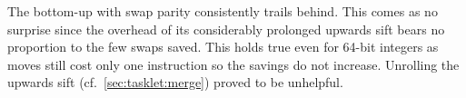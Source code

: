 The bottom-up \HS{} with swap parity consistently trails behind.
This comes as no surprise since the overhead of its considerably prolonged upwards sift bears no proportion to the few swaps saved.
This holds true even for 64-bit integers as moves still cost only one instruction so the savings do not increase.
Unrolling the upwards sift (cf.\ \cref{sec:tasklet:merge}) proved to be unhelpful.
